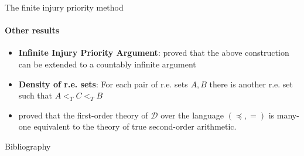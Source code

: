 \documentclass{beamer}
\begin{document}
\begin{frame}{The finite injury priority method}
\framesubtitle{Other results}
    \begin{itemize}[<+->]
        \item \textbf{Infinite Injury Priority Argument}: \textcite{sacks} proved that the above construction can be extended to a countably infinite argument
        
        \item \textbf{Density of r.e. sets}: For each pair of r.e. sets $A, B$ there is another r.e. set such that $A <_T C <_T B$
        \item \textcite{simpson} proved that the first-order theory of $\mathcal{D}$ over the language $(\preceq, = )$ is many-one equivalent to the theory of true second-order arithmetic. 
    \end{itemize}
\end{frame}

\backmatter[notitle]
    
\begin{frame}{Bibliography}
\framesubtitle{{}}
    \printbibliography
\end{frame}
\end{document}
